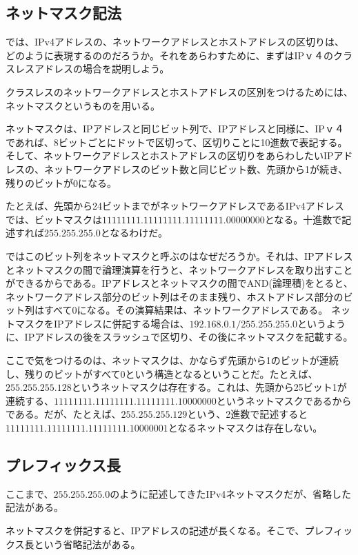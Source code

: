\subsection{ネットマスク記法}

では、IPv4アドレスの、ネットワークアドレスとホストアドレスの区切りは、どのように表現するののだろうか。それをあらわすために、まずはIPｖ４のクラスレスアドレスの場合を説明しよう。

クラスレスのネットワークアドレスとホストアドレスの区別をつけるためには、ネットマスクというものを用いる。

ネットマスクは、IPアドレスと同じビット列で、IPアドレスと同様に、IPｖ４であれば、8ビットごとにドットで区切って、区切りことに10進数で表記する。そして、ネットワークアドレスとホストアドレスの区切りをあらわしたいIPアドレスの、ネットワークアドレスのビット数と同じビット数、先頭から1が続き、残りのビットが0になる。

たとえば、先頭から24ビットまでがネットワークアドレスであるIPv4アドレスでは、ビットマスクは$11111111.11111111.11111111.00000000$となる。十進数で記述すれば$255.255.255.0$となるわけだ。

ではこのビット列をネットマスクと呼ぶのはなぜだろうか。それは、IPアドレスとネットマスクの間で論理演算を行うと、ネットワークアドレスを取り出すことができるからである。IPアドレスとネットマスクの間でAND(論理積)をとると、ネットワークアドレス部分のビット列はそのまま残り、ホストアドレス部分のビット列はすべて0になる。その演算結果は、ネットワークアドレスである。
ネットマスクをIPアドレスに併記する場合は、$192.168.0.1/255.255.255.0$というように、IPアドレスの後をスラッシュで区切り、その後にネットマスクを記載する。

ここで気をつけるのは、ネットマスクは、かならず先頭から1のビットが連続し、残りのビットがすべて0という構造となるということだ。たとえば、$255.255.255.128$というネットマスクは存在する。これは、先頭から25ビット1が連続する、$11111111.11111111.11111111.10000000$というネットマスクであるからである。だが、たとえば、$255.255.255.129$という、2進数で記述すると$11111111.11111111.11111111.10000001$となるネットマスクは存在しない。


\subsection{プレフィックス長}

ここまで、$255.255.255.0$のように記述してきたIPv4ネットマスクだが、省略した記法がある。

ネットマスクを併記すると、IPアドレスの記述が長くなる。そこで、プレフィックス長という省略記法がある。

